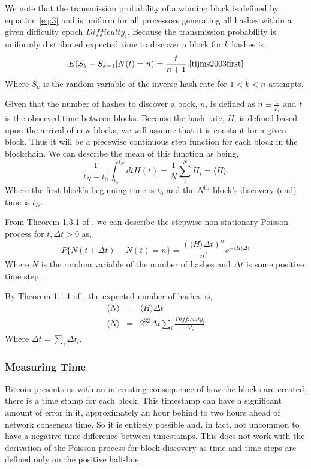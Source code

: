 \documentclass[runningheads]{llncs}
\begin{document}
We note that the transmission probability of a winning block is defined by equation \ref{eq:3} and is uniform for all processors generating all hashes within a given difficulty epoch $Difficulty_i$.
Because the transmission probability is uniformly distributed expected time to discover a block for $k$ hashes is, 
\begin{equation}
    E(S_k - S_{k - 1}| N(t) = n) = \frac{t}{n + 1}.\mbox{\cite{tijms2003first}}
\end{equation}
Where $S_k$ is the random variable of the inverse hash rate for $1 < k < n$ attempts.

Given that the number of hashes to discover a bock, $n$, is defined as $n \equiv \frac{1}{p_i}$ and $t$ is the observed time between blocks.
Because the hash rate, $H$, is defined based upon the arrival of new blocks, we will assume that it is constant for a given block.
Thus it will be a piecewise continuous step function for each block in the blockchain.
We can describe the mean of this function as being,
\begin{equation}
    \frac{1}{t_N - t_0}\int_{t_0}^{t_N} dt H(t) =  \frac{1}{N}\sum_i^N H_i = \langle H \rangle. \label{eq:7}
\end{equation}
Where the first block's beginning time is $t_0$ and the $N^{\mbox{th}}$ block's discovery (end) time is $t_N$.

From Theorem 1.3.1 of \cite{tijms2003first}, we can describe the stepwise non stationary Poisson process for $t,\Delta t >0$ as,
\begin{equation}
    P\lbrace N(t + \Delta t) - N(t)= n\rbrace = \frac{(\langle H \rangle \Delta t)^n}{n!}e^{-\langle H \rangle \Delta t}\label{eq:8}
\end{equation}
Where $N$ is the random variable of the number of hashes and $\Delta t$ is some positive time step.

By Theorem 1.1.1 of \cite{tijms2003first}, the expected number of hashes is,
\begin{eqnarray}
    \langle N \rangle &=& \langle H \rangle \Delta t \\
    \langle N \rangle &=& 2^{32} \Delta t \sum_i \frac{Difficulty_i}{\Delta t_i}
\end{eqnarray}
Where $\Delta t = \sum_i \Delta t_i$.

\subsubsection{Measuring Time}
Bitcoin presents us with an interesting consequence of how the blocks are created, there is a time stamp for each block.
This timestamp can have a significant amount of error in it, approximately an hour behind to two hours ahead of network consensus time.
So it is entirely possible and, in fact, not uncommon to have a negative time difference between timestamps.
This does not work with the derivation of the Poisson process for block discovery as time and time steps are defined only on the positive half-line.
\end{document}
